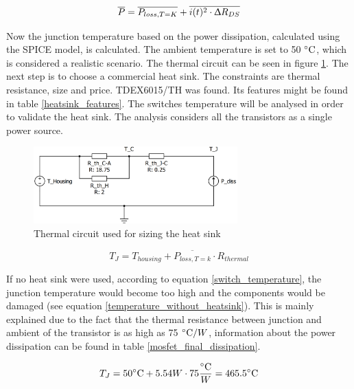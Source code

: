 \begin{equation} \label{total_losses}
\overline{P} = \overline{P_{loss, T = K}} + \overline{i(t)^2 \cdot \Updelta R_{DS}}
\end{equation}

Now the junction temperature based on the power dissipation, calculated using the SPICE model, is calculated. The ambient temperature is set to 50 $\decC$, which is considered a realistic scenario. The thermal circuit can be seen in figure \ref{thermal_circuit}. The next step is to choose a commercial heat sink. The constraints are thermal resistance, size and price. TDEX6015/TH was found. Its features might be found in table \ref{heatsink_features}. The switches temperature will be analysed in order to validate the heat sink. The analysis considers all the transistors as a single power source.

\begin{figure}[H]
	\begin{center}
		\includegraphics[width=0.7\textwidth]{../Pictures/thermal_circuit.png}
		\caption{Thermal circuit used for sizing the heat sink}
		\label{thermal_circuit}
	\end{center}	
\end{figure}

\begin{equation} \label{switch_temperature}
T_{J} = T_{housing} + \overline{P_{loss, T = k}} \cdot  R_{thermal}
\end{equation}


If no heat sink were used, according to equation \ref{switch_temperature}, the junction temperature would become too high and the components would be damaged (see equation \ref{temperature_without_heatsink}). This is mainly explained due to the fact that the thermal resistance between junction and ambient of the transistor is as high as 75 $\decC / W$, information about the power dissipation can be found in table \ref{mosfet_final_dissipation}.

\begin{equation} \label{temperature_without_heatsink}
T_{J} = 50 \decC + 5.54 W \cdot 75 \frac{\decC}{W} = 465.5 \decC
\end{equation}


